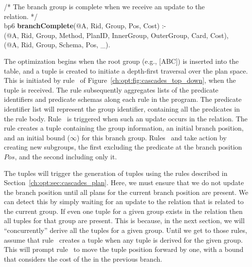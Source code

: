 \begin{figure*}
\begin{boxedminipage}{\linewidth}
/* The branch group is complete when we receive an update to the  \\
    relation. */ \\
bp6 {\bf branchComplete}(@A, Rid, Group, Pos, Cost) :- \\
(@A, Rid, Group, Method, PlanID, InnerGroup, OuterGroup, Card, Cost), \\
(@A, Rid, Group, Schema, Pos, \_). \\
  
\end{boxedminipage}
\caption{\label{ch:opt:fig:cascades_top_down} Cascades top-down search strategy rules.}
\end{figure*}

The optimization begins when the root group (e.g., [ABC]) is inserted into the
 table, and a  tuple is created to initiate a depth-first
traversal over the plan space.  This is initiated by rule~ of
Figure~\ref{ch:opt:fig:cascades_top_down}, when the 
tuple is received.  The rule subsequently aggregates lists of the predicate
identifiers and predicate schemas along each rule in the program.  The
predicate identifier list will represent the group identifier, containing all
the predicates in the rule body.  Rule~ is triggered when such an
update occurs in the  relation.  The rule creates a  tuple
containing the group information, an initial branch position, and an initial
bound ($\infty$) for this branch group.  Rules~ and  take
action by creating new subgroups, the first excluding the predicate at the
branch position $Pos$, and the second including only it.

The  tuples will trigger the generation of  tuples using
the rules described in Section~\ref{ch:opt:sec:cascades_plan}.  Here, we must
ensure that we do not update the branch position until all plans for the
current branch position are present.  We can detect this by simply waiting for
an update to the  relation that is related to the current 
group.  If even one  tuple for a given group exists in the 
relation then all  tuples for that group are present.  This is
because, in the next section, we will ``concurrently'' derive all the 
tuples for a given group.  Until we get to those rules, assume that
rule~ creates a  tuple when any  tuple is
derived for the given group.  This will prompt rule~ to move the
 tuple position forward by one, with a bound that considers the
cost of the  in the previous branch.

